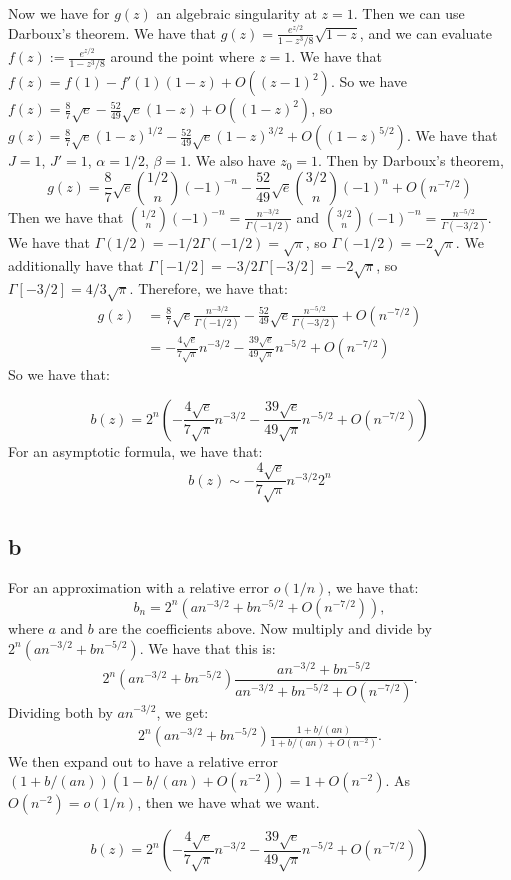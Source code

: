 \documentclass[]{article}
\theoremstyle{definition}
\numberwithin{theorem}{section}
\numberwithin{equation}{section}
\begin{document}
Now we have for $g(z)$ an algebraic singularity at $z = 1$. Then we can use Darboux's theorem. We have that $g(z) = \frac{e^{z/2}}{1 - z^3/8} \sqrt{1 - z}$, and we can evaluate $f(z) := \frac{e^{z/2}}{1 - z^3/8} $ around the point where $z = 1$. 
We have that $f(z) = f(1) - f'(1) (1 - z) + O((z - 1)^2)$. So we have $f(z) = \frac{8}{7}\sqrt{e} -  \frac{52}{49}\sqrt{e}(1-z) + O((1 - z)^2)$, so $g(z) = \frac{8}{7}\sqrt{e}(1 - z)^{1/2} -  \frac{52}{49}\sqrt{e}(1-z)^{3/2} + O((1 - z)^{5/2})$. 
We have that $J = 1$, $J' = 1$, $\alpha = 1/2$, $\beta = 1$. We also have $z_0 = 1$.
Then by Darboux's theorem, 
\begin{equation}
	[z^n] g(z) = \frac{8}{7}\sqrt{e} \binom{1/2}{n} (-1)^{-n} -  \frac{52}{49}\sqrt{e} \binom{3/2}{n}(-1)^n + O(n^{-7/2})
\end{equation}
Then we have that $\binom{1/2}{n} (-1)^{-n} = \frac{n^{-3/2}}{\Gamma(-1/2)}$ and  $\binom{3/2}{n} (-1)^{-n} = \frac{n^{-5/2}}{\Gamma(-3/2)}$. 
We have that $\Gamma(1/2) = -1/2 \Gamma(-1/2) = \sqrt{\pi}$, so $\Gamma(-1/2) = - 2 \sqrt{\pi}$. We additionally have that $\Gamma[-1/2] = -3/2 \Gamma[-3/2] = -2 \sqrt{\pi}$, so $\Gamma[-3/2] = 4/3 \sqrt{\pi}$. Therefore, we have that:
\begin{align*}
	[z^n] g(z) &= \frac{8}{7}\sqrt{e} \frac{n^{-3/2}}{\Gamma(-1/2)} -  \frac{52}{49}\sqrt{e} \frac{n^{-5/2}}{\Gamma(-3/2)} + O(n^{-7/2})\\
	&= -\frac{4 \sqrt{e}}{7 \sqrt{\pi}} n^{-3/2} - \frac{39 \sqrt{e}}{49\sqrt{\pi}} n^{-5/2} + O(n^{-7/2})
\end{align*}
So we have that:

\begin{equation}
	[z^n] b(z) = 2^n \left( -\frac{4 \sqrt{e}}{7 \sqrt{\pi}} n^{-3/2} - \frac{39 \sqrt{e}}{49\sqrt{\pi}} n^{-5/2} + O(n^{-7/2})\right)
\end{equation}
For an asymptotic formula, we have that:
\begin{equation}
	[z^n] b(z) \sim -\frac{4 \sqrt{e}}{7 \sqrt{\pi}} n^{-3/2} 2^n
\end{equation}
\subsection{b}
For an approximation with a relative error $o(1/n)$, we have that:
\begin{equation}
	b_n = 2^n ( a n^{-3/2} + b n^{-5/2} + O(n^{-7/2})),
\end{equation}
where $a$ and $b$ are the coefficients above. 
Now multiply and divide by $2^n(a n^{-3/2} + b n^{-5/2})$. We have that this is:
\begin{equation}
	2^n(a n^{-3/2} + b n^{-5/2}) \frac{a n^{-3/2} + b n^{-5/2}}{a n^{-3/2} + b n^{-5/2} + O(n^{-7/2})}.
\end{equation}
Dividing both by $a n^{-3/2}$, we get:
\begin{align*}
	2^n(a n^{-3/2} + b n^{-5/2}) \frac{1 + b/(an)}{1 + b/(an) + O(n^{-2})}.
\end{align*}
We then expand out to have a relative error $(1 + b/(an)) (1 -b/(an) + O(n^{-2})) = 1 + O(n^{-2})$. As $O(n^{-2})  = o(1/n)$, then we have what we want. 

\begin{equation}
	[z^n] b(z) = 2^n \left( -\frac{4 \sqrt{e}}{7 \sqrt{\pi}} n^{-3/2} - \frac{39 \sqrt{e}}{49\sqrt{\pi}} n^{-5/2} + O(n^{-7/2})\right)
\end{equation}
\end{document}
